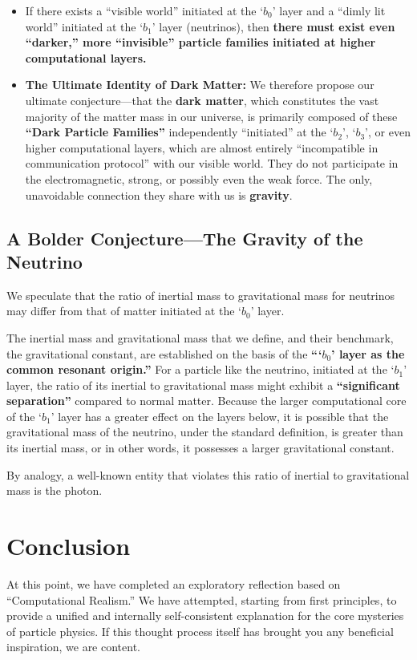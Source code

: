 \documentclass[11pt, a4paper]{article}
\begin{document}
\begin{itemize}
    \item If there exists a ``visible world'' initiated at the `$b_0$' layer and a ``dimly lit world'' initiated at the `$b_1$' layer (neutrinos), then \textbf{there must exist even ``darker,'' more ``invisible'' particle families initiated at higher computational layers.}

    \item \textbf{The Ultimate Identity of Dark Matter:} We therefore propose our ultimate conjecture—that the \textbf{dark matter}, which constitutes the vast majority of the matter mass in our universe, is primarily composed of these \textbf{``Dark Particle Families''} independently ``initiated'' at the `$b_2$', `$b_3$', or even higher computational layers, which are almost entirely ``incompatible in communication protocol'' with our visible world. They do not participate in the electromagnetic, strong, or possibly even the weak force. The only, unavoidable connection they share with us is \textbf{gravity}.
\end{itemize}

\subsection{A Bolder Conjecture---The Gravity of the Neutrino}
We speculate that the ratio of inertial mass to gravitational mass for neutrinos may differ from that of matter initiated at the `$b_0$' layer.

The inertial mass and gravitational mass that we define, and their benchmark, the gravitational constant, are established on the basis of the \textbf{“`$b_0$' layer as the common resonant origin.”} For a particle like the neutrino, initiated at the `$b_1$' layer, the ratio of its inertial to gravitational mass might exhibit a \textbf{``significant separation''} compared to normal matter. Because the larger computational core of the `$b_1$' layer has a greater effect on the layers below, it is possible that the gravitational mass of the neutrino, under the standard definition, is greater than its inertial mass, or in other words, it possesses a larger gravitational constant.

By analogy, a well-known entity that violates this ratio of inertial to gravitational mass is the photon.

\section*{Conclusion}
At this point, we have completed an exploratory reflection based on ``Computational Realism.'' We have attempted, starting from first principles, to provide a unified and internally self-consistent explanation for the core mysteries of particle physics. If this thought process itself has brought you any beneficial inspiration, we are content.
\end{document}
